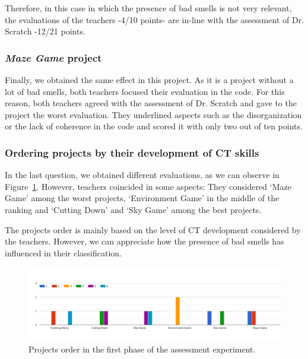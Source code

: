 Therefore, in this case in which the presence of bad smells is not very relevant, the evaluations of the teachers -4/10 points- are in-line with the assessment of Dr. Scratch -12/21 points.


\subsubsection{\textit{Maze Game} project}
\label{subsub:maze_game}

Finally, we obtained the same effect in this project. As it is a project without a lot of bad smells, both teachers focused their evaluation in the code. For this reason, both teachers agreed with the assessment of Dr. Scratch and gave to the project the worst evaluation. They underlined aspects such as the disorganization or the lack of coherence in the code and scored it with only two out of ten points.

\subsubsection{Ordering projects by their development of CT skills}
\label{subsub:projects_order_phase_1}

In the last question, we obtained different evaluations, as we can observe in Figure~\ref{fig:projects_order_1}. However, teachers coincided in some aspects: They considered `Maze Game' among the worst projects, `Environment Game' in the middle of the ranking and `Cutting Down' and `Sky Game' among the best projects. 

The projects order is mainly based on the level of CT development considered by the teachers. However, we can appreciate how the presence of bad smells has influenced in their classification. 


\begin{figure}
    \centering
    \includegraphics[width=16cm,                         keepaspectratio]{img/order_projects_1.png}
    \caption{Projects order in the first phase of the assessment experiment.}
    \label{fig:projects_order_1}
\end{figure}


